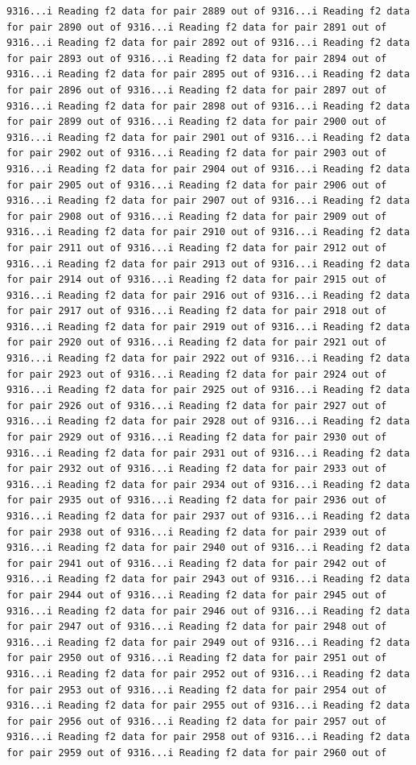 \documentclass[
]{article}
\begin{document}
\begin{verbatim}
9316...i Reading f2 data for pair 2889 out of 9316...i Reading f2 data for pair 2890 out of 9316...i Reading f2 data for pair 2891 out of 9316...i Reading f2 data for pair 2892 out of 9316...i Reading f2 data for pair 2893 out of 9316...i Reading f2 data for pair 2894 out of 9316...i Reading f2 data for pair 2895 out of 9316...i Reading f2 data for pair 2896 out of 9316...i Reading f2 data for pair 2897 out of 9316...i Reading f2 data for pair 2898 out of 9316...i Reading f2 data for pair 2899 out of 9316...i Reading f2 data for pair 2900 out of 9316...i Reading f2 data for pair 2901 out of 9316...i Reading f2 data for pair 2902 out of 9316...i Reading f2 data for pair 2903 out of 9316...i Reading f2 data for pair 2904 out of 9316...i Reading f2 data for pair 2905 out of 9316...i Reading f2 data for pair 2906 out of 9316...i Reading f2 data for pair 2907 out of 9316...i Reading f2 data for pair 2908 out of 9316...i Reading f2 data for pair 2909 out of 9316...i Reading f2 data for pair 2910 out of 9316...i Reading f2 data for pair 2911 out of 9316...i Reading f2 data for pair 2912 out of 9316...i Reading f2 data for pair 2913 out of 9316...i Reading f2 data for pair 2914 out of 9316...i Reading f2 data for pair 2915 out of 9316...i Reading f2 data for pair 2916 out of 9316...i Reading f2 data for pair 2917 out of 9316...i Reading f2 data for pair 2918 out of 9316...i Reading f2 data for pair 2919 out of 9316...i Reading f2 data for pair 2920 out of 9316...i Reading f2 data for pair 2921 out of 9316...i Reading f2 data for pair 2922 out of 9316...i Reading f2 data for pair 2923 out of 9316...i Reading f2 data for pair 2924 out of 9316...i Reading f2 data for pair 2925 out of 9316...i Reading f2 data for pair 2926 out of 9316...i Reading f2 data for pair 2927 out of 9316...i Reading f2 data for pair 2928 out of 9316...i Reading f2 data for pair 2929 out of 9316...i Reading f2 data for pair 2930 out of 9316...i Reading f2 data for pair 2931 out of 9316...i Reading f2 data for pair 2932 out of 9316...i Reading f2 data for pair 2933 out of 9316...i Reading f2 data for pair 2934 out of 9316...i Reading f2 data for pair 2935 out of 9316...i Reading f2 data for pair 2936 out of 9316...i Reading f2 data for pair 2937 out of 9316...i Reading f2 data for pair 2938 out of 9316...i Reading f2 data for pair 2939 out of 9316...i Reading f2 data for pair 2940 out of 9316...i Reading f2 data for pair 2941 out of 9316...i Reading f2 data for pair 2942 out of 9316...i Reading f2 data for pair 2943 out of 9316...i Reading f2 data for pair 2944 out of 9316...i Reading f2 data for pair 2945 out of 9316...i Reading f2 data for pair 2946 out of 9316...i Reading f2 data for pair 2947 out of 9316...i Reading f2 data for pair 2948 out of 9316...i Reading f2 data for pair 2949 out of 9316...i Reading f2 data for pair 2950 out of 9316...i Reading f2 data for pair 2951 out of 9316...i Reading f2 data for pair 2952 out of 9316...i Reading f2 data for pair 2953 out of 9316...i Reading f2 data for pair 2954 out of 9316...i Reading f2 data for pair 2955 out of 9316...i Reading f2 data for pair 2956 out of 9316...i Reading f2 data for pair 2957 out of 9316...i Reading f2 data for pair 2958 out of 9316...i Reading f2 data for pair 2959 out of 9316...i Reading f2 data for pair 2960 out of 
\end{verbatim}
\end{document}
